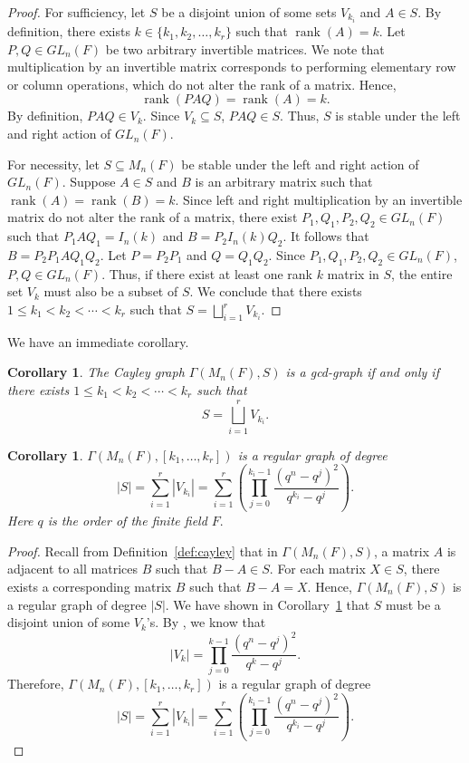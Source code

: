 \documentclass[12pt, a4paper]{amsart}
\newtheorem{cor}[thm]{Corollary}
\theoremstyle{definition}
\numberwithin{equation}{section}
\DeclareMathOperator{\rank}{rank}
\begin{document}
\begin{proof}
    For sufficiency, let $S$ be a disjoint union of some sets $V_{k_i}$ and $A \in S$. By definition, there exists $k \in \{k_1,k_2,\ldots,k_r\}$ such that $ \rank(A) = k.$ Let $P,Q \in GL_n(F)$ be two arbitrary invertible matrices. We note that multiplication by an invertible matrix corresponds to performing elementary row or column operations, which do not alter the rank of a matrix. Hence,
    \[\rank(PAQ) = \rank(A) = k.\]
    By definition, $PAQ \in V_k$. Since $V_k \subseteq S$, $PAQ \in S$. Thus, $S$ is stable under the left and right action of $GL_n(F)$.\par
    For necessity, let $S \subseteq M_n(F)$ be stable under the left and right action of $GL_n(F)$. Suppose $A \in S$ and $B$ is an arbitrary matrix such that $\rank(A)=\rank(B)=k$. Since left and right multiplication by an invertible matrix do not alter the rank of a matrix, there exist $P_1, Q_1, P_2, Q_2 \in GL_n(F)$ such that $P_1 A Q_1=I_n(k)$ and $B = P_2 I_n(k) Q_2$. It follows that $B = P_2 P_1 A Q_1 Q_2.$ Let $P=P_2P_1$ and $Q=Q_1Q_2$. Since $P_1, Q_1, P_2, Q_2 \in GL_n(F)$, $P,Q \in GL_n(F)$. Thus, if there exist at least one rank $k$ matrix in $S$, the entire set $V_k$ must also be a subset of $S$. We conclude that there exists $1 \leq k_1 <k_2 < \cdots < k_r$ such that $S= \bigsqcup_{i=1}^r V_{k_i}.$
\end{proof}
We have an immediate corollary. 
\begin{cor} \label{cor:generating_set}
    The Cayley graph $\Gamma(M_n(F),S)$ is a gcd-graph if and only if there exists $1 \leq k_1 < k_2 < \cdots <k_r$ such that 
    \[S= \bigsqcup_{i=1}^r V_{k_i}.\]
\end{cor}

\begin{cor}
    $\Gamma(M_n(F), [k_1, \ldots, k_r])$ is a regular graph of degree 
    \[|S| = \sum_{i=1}^r |V_{k_i}|=\sum_{i=1}^r \left( \prod_{j=0}^{k_i-1} \frac{(q^n-q^j)^2}{q^{k_i}-q^j} \right).\]
    Here $q$ is the order of the finite field $F.$
\end{cor}
\begin{proof}
    Recall from Definition~\ref{def:cayley} that in $\Gamma(M_n(F), S)$, a matrix $A$ is adjacent to all matrices $B$ such that $B-A \in S$. For each matrix $X \in S$, there exists a corresponding matrix $B$ such that $B-A=X$.  Hence, $\Gamma(M_n(F), S)$ is a regular graph of degree $|S|$.
    We have shown in Corollary~\ref{cor:generating_set} that $S$ must be a disjoint union of some $V_k$'s. By \cite[Formula 3]{Migler01102006}, we know that
    \[|V_k| = \prod_{j=0}^{k-1} \frac{(q^n-q^j)^2}{q^k-q^j}.\]
    Therefore, $\Gamma(M_n(F), [k_1, \ldots, k_r])$ is a regular graph of degree 
    \[|S| = \sum_{i=1}^r |V_{k_i}|=\sum_{i=1}^r \left( \prod_{j=0}^{k_i-1} \frac{(q^n-q^j)^2}{q^{k_i}-q^j} \right).\]
\end{proof}
\end{document}
